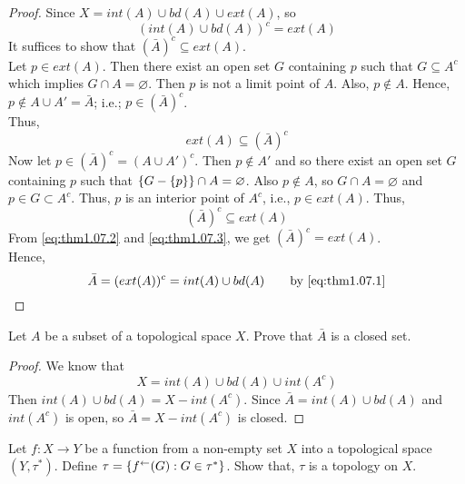 \documentclass[../main-sheet.tex]{subfiles}
\begin{document}
\begin{proof}
    Since  \(X = int(A) \cup bd(A)\cup ext(A)\), so
    \begin{equation}
        (int(A)\cup bd(A))^c=ext(A) \label{eq:thm1.07.1}
    \end{equation}
    It suffices to show that  \((\bar{A})^{c} \subseteq ext(A)\).\\
    Let  \(p \in ext(A)\). Then there exist an open set  \(G\) containing  \(p\)
    such that  \(G \subseteq A^{c}\) which implies  \(G \cap A = \varnothing\). Then  \(p\) is not a limit point of  \(A\). Also,  \(p\notin A\). Hence,  \(p\notin A\cup A'=\bar{A}\); i.e.; \(p \in(\bar{A})^c\).\\
    Thus,
    \begin{equation}
        ext(A)\subseteq(\bar{A})^{c}\label{eq:thm1.07.2}
    \end{equation}
    Now let  \(p \in(\bar{A})^c = (A \cup A')^{c}\). Then  \(p\notin A'\) and so there exist
    an open set  \(G\) containing  \(p\) such that  \(\left\{G-\left\{p\right\}\right\}\cap A=\varnothing\). Also
     \(p\notin A\), so  \(G \cap A =\varnothing\) and  \(p\in G\subset A^{c}\). Thus,  \(p\) is an interior
    point of  \(A^{c}\), i.e.,  \(p \in ext(A)\). Thus,
    \begin{equation}
        (\bar{A})^{c}\subseteq ext(A) \label{eq:thm1.07.3}
    \end{equation}
    From \eqref{eq:thm1.07.2} and \eqref{eq:thm1.07.3}, we get  \((\bar{A})^{c} = ext(A)\).\\
    Hence,
    \[
        \bar{A}=(ext(A))^c=int(A)\cup bd(A) \qquad\text{by \eqref{eq:thm1.07.1}}
    \]
\end{proof}
\begin{thm}
    Let  \(A\) be a subset of a topological space  \(X\). Prove
    that  \(\bar{A}\) is a closed set.
\end{thm}
\begin{proof}
    We know that
    \[X = int(A) \cup bd(A) \cup int(A^{c})\]
    Then  \(int(A) \cup bd(A) = X - int(A^{c})\). Since  \(\bar{A} = int(A) \cup bd(A)\)
    and  \(int(A^{c})\) is open, so  \(\bar{A} = X - int(A^{c})\) is closed.
\end{proof}
\begin{prob}
    Let  \(f:X\to Y\) be a function from a non-empty set
     \(X\) into a topological space  \((Y,\tau^*)\). Define  \(\tau = \left\{f^{\leftarrow}(G): G \in \tau^*\right\}\).
    Show that,  \(\tau\) is a topology on  \(X\).
\end{prob}
\end{document}
